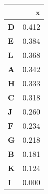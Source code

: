 \begin{table}[!h]
\centering
\begin{tabular}[t]{>{}lr}
\toprule
  & x\\
\midrule
\textbf{D} & 0.412\\
\textbf{E} & 0.384\\
\textbf{L} & 0.368\\
\textbf{A} & 0.342\\
\textbf{H} & 0.333\\
\textbf{C} & 0.318\\
\textbf{J} & 0.260\\
\textbf{F} & 0.234\\
\textbf{G} & 0.218\\
\textbf{B} & 0.181\\
\textbf{K} & 0.124\\
\textbf{I} & 0.000\\
\bottomrule
\end{tabular}
\end{table}
